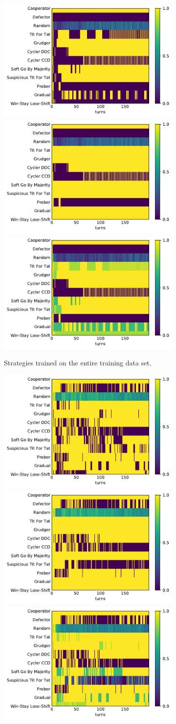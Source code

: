 \begin{figure}[!htbp]
    \begin{subfigure}{\textwidth}
        \includegraphics[width=.3\textwidth]{src/chapters/07/img/beautil_lstm_sequence_0.pdf}
        \includegraphics[width=.3\textwidth]{src/chapters/07/img/beautil_lstm_sequence_1.pdf}
        \includegraphics[width=.3\textwidth]{src/chapters/07/img/beautil_lstm_sequence_0_78.pdf}
        \caption{Strategies trained on the entire training data set.}
    \end{subfigure}
    \begin{subfigure}{\textwidth}
        \includegraphics[width=.3\textwidth]{src/chapters/07/img/beautil_top_twenty_sequence_0.pdf}
        \includegraphics[width=.3\textwidth]{src/chapters/07/img/beautil_top_twenty_sequence_1.pdf}
        \includegraphics[width=.3\textwidth]{src/chapters/07/img/beautil_top_twenty_sequence_0_78.pdf}

\end{subfigure}
\end{figure}
